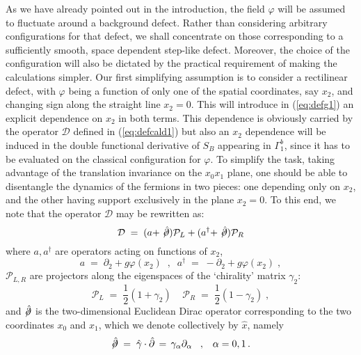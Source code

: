 \documentclass[a4paper,12pt]{article}
\begin{document}
As we have already pointed out in the introduction, the field $\varphi$ will
be assumed to fluctuate around a background defect.  Rather than
considering arbitrary configurations for that defect, we shall
concentrate on those corresponding to a sufficiently smooth, space
dependent step-like defect.  Moreover, the choice of the configuration
will also be dictated by the practical requirement of making the
calculations simpler. Our first simplifying assumption is to consider
a rectilinear defect, with $\varphi$ being a function of only one of the
spatial coordinates, say $x_2$, and changing sign along the straight
line $x_2=0$. This will introduce in (\ref{eq:defg1}) an explicit
dependence on $x_2$ in both terms. This dependence is obviously
carried by the operator ${\mathcal D}$ defined in (\ref{eq:defcald1})
but also an $x_2$ dependence will be induced in the double functional
derivative of $S_B$ appearing in $\Gamma_1^b$, since it has to be evaluated
on the classical configuration for $\varphi$.  To simplify the task, taking
advantage of the translation invariance on the $x_0x_1$ plane, one
should be able to disentangle the dynamics of the fermions in two
pieces: one depending only on $x_2$, and the other having support
exclusively in the plane $x_2=0$. To this end, we note that the
operator ${\mathcal D}$ may be rewritten as:
\begin{equation}
  \label{eq:defcald2}
{\mathcal D} \;=\; (a+\not\!{\hat \partial}) {\mathcal P}_L  
+ (a^\dagger+\not\!{\hat \partial}) {\mathcal P}_R
\end{equation}
where $a, a^\dagger$ are operators acting on functions of $x_2$,
\begin{equation}
  \label{eq:defaad}
a\;=\;\partial_2 + g \varphi(x_2) \;\;,\;\; 
a^\dagger\;=\;-\partial_2 + g \varphi(x_2) \;,
\end{equation}
${\mathcal P}_{L,R}$ are projectors along the eigenspaces of the
`chirality' matrix $\gamma_2$:
\begin{equation}
  \label{eq:defplr}
{\mathcal P}_L \;=\; \frac{1}{2} (1 + \gamma_2) \;\;\;\;
{\mathcal P}_R \;=\; \frac{1}{2} (1 - \gamma_2) \;,
\end{equation}
and $\not \! {\hat \partial}$ is the two-dimensional Euclidean Dirac
operator corresponding to the two coordinates $x_0$ and $x_1$, which
we denote collectively by ${\hat x}$, namely
\begin{equation}
  \label{eq:defsmalld}
\not \! {\hat \partial}\;=\; {\hat \gamma} \cdot {\hat \partial} \,=\, \gamma_\alpha \partial_\alpha \;\;\;, 
\;\;\; \alpha = 0, 1\,.
\end{equation}
\end{document}
